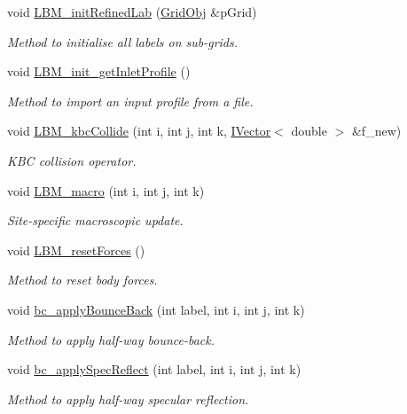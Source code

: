 \begin{DoxyCompactItemize}
void \hyperlink{class_grid_obj_a3ba133d06625fb576ca0909b946033b2}{L\+B\+M\+\_\+init\+Refined\+Lab} (\hyperlink{class_grid_obj}{Grid\+Obj} \&p\+Grid)
\begin{DoxyCompactList}\small\item\em Method to initialise all labels on sub-\/grids. \end{DoxyCompactList}\item 
void \hyperlink{class_grid_obj_a023713976673d029103690a91c5415f9}{L\+B\+M\+\_\+init\+\_\+get\+Inlet\+Profile} ()
\begin{DoxyCompactList}\small\item\em Method to import an input profile from a file. \end{DoxyCompactList}\item 
void \hyperlink{class_grid_obj_ac4ca0327a53171fe8e1c3076e9f1353f}{L\+B\+M\+\_\+kbc\+Collide} (int i, int j, int k, \hyperlink{class_i_vector}{I\+Vector}$<$ double $>$ \&f\+\_\+new)
\begin{DoxyCompactList}\small\item\em K\+BC collision operator. \end{DoxyCompactList}\item 
void \hyperlink{class_grid_obj_ab69942450175d12c75f4b8d33b06c905}{L\+B\+M\+\_\+macro} (int i, int j, int k)
\begin{DoxyCompactList}\small\item\em Site-\/specific macroscopic update. \end{DoxyCompactList}\item 
void \hyperlink{class_grid_obj_a5701631be6333e512c7fc8dd6ecabf85}{L\+B\+M\+\_\+reset\+Forces} ()
\begin{DoxyCompactList}\small\item\em Method to reset body forces. \end{DoxyCompactList}\item 
void \hyperlink{class_grid_obj_a2dc94b1d2e3f14a1a086b8bfa078839b}{bc\+\_\+apply\+Bounce\+Back} (int label, int i, int j, int k)
\begin{DoxyCompactList}\small\item\em Method to apply half-\/way bounce-\/back. \end{DoxyCompactList}\item 
void \hyperlink{class_grid_obj_ae1d63a43d1dee6c7b25880c8a9bb97c9}{bc\+\_\+apply\+Spec\+Reflect} (int label, int i, int j, int k)
\begin{DoxyCompactList}\small\item\em Method to apply half-\/way specular reflection. \end{DoxyCompactList}\item 

\end{DoxyCompactItemize}
